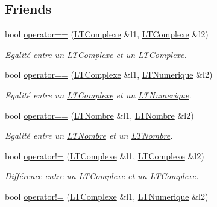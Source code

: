 \subsection*{Friends}
\begin{DoxyCompactItemize}
\item 
bool \hyperlink{class_l_t_nombre_a90de9fd7544467c35afbcb629ee15ef8}{operator==} (\hyperlink{class_l_t_complexe}{L\+T\+Complexe} \&l1, \hyperlink{class_l_t_complexe}{L\+T\+Complexe} \&l2)
\begin{DoxyCompactList}\small\item\em Egalité entre un \hyperlink{class_l_t_complexe}{L\+T\+Complexe} et un \hyperlink{class_l_t_complexe}{L\+T\+Complexe}. \end{DoxyCompactList}\item 
bool \hyperlink{class_l_t_nombre_ab60d8e825b53b8ffdfd42c983314c737}{operator==} (\hyperlink{class_l_t_complexe}{L\+T\+Complexe} \&l1, \hyperlink{class_l_t_numerique}{L\+T\+Numerique} \&l2)
\begin{DoxyCompactList}\small\item\em Egalité entre un \hyperlink{class_l_t_complexe}{L\+T\+Complexe} et un \hyperlink{class_l_t_numerique}{L\+T\+Numerique}. \end{DoxyCompactList}\item 
bool \hyperlink{class_l_t_nombre_a42b4bdeb6c1ef2473f5291e2dc72661c}{operator==} (\hyperlink{class_l_t_nombre}{L\+T\+Nombre} \&l1, \hyperlink{class_l_t_nombre}{L\+T\+Nombre} \&l2)
\begin{DoxyCompactList}\small\item\em Egalité entre un \hyperlink{class_l_t_nombre}{L\+T\+Nombre} et un \hyperlink{class_l_t_nombre}{L\+T\+Nombre}. \end{DoxyCompactList}\item 
bool \hyperlink{class_l_t_nombre_a853bdb2627cdac60f907026fef1bfec3}{operator!=} (\hyperlink{class_l_t_complexe}{L\+T\+Complexe} \&l1, \hyperlink{class_l_t_complexe}{L\+T\+Complexe} \&l2)
\begin{DoxyCompactList}\small\item\em Différence entre un \hyperlink{class_l_t_complexe}{L\+T\+Complexe} et un \hyperlink{class_l_t_complexe}{L\+T\+Complexe}. \end{DoxyCompactList}\item 
bool \hyperlink{class_l_t_nombre_a0c157bab9d494f8c817fe550ec5279d1}{operator!=} (\hyperlink{class_l_t_complexe}{L\+T\+Complexe} \&l1, \hyperlink{class_l_t_numerique}{L\+T\+Numerique} \&l2)

\end{DoxyCompactItemize}

